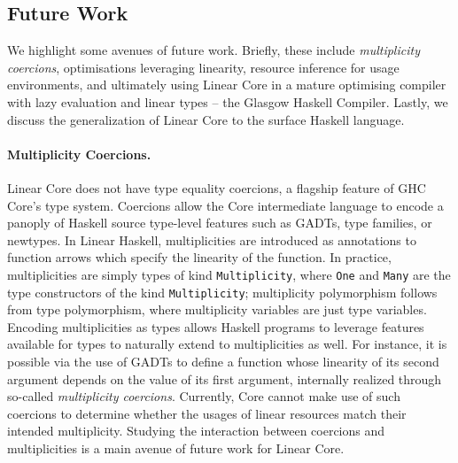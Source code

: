 \documentclass[acmsmall,review,anonymous,screen]{acmart}
\newcommand{\incode}[1]{\lstinline{#1}}
\begin{document}
% 

\subsection{Future Work\label{sec:future-work}}

We highlight some avenues of future work. Briefly,
these include \emph{multiplicity coercions}, optimisations leveraging
linearity, resource inference for usage environments, and ultimately using
Linear Core in a mature optimising compiler with lazy evaluation and linear
types -- the Glasgow Haskell Compiler. Lastly, we discuss the
generalization of Linear Core to the surface Haskell language.

\paragraph{Multiplicity Coercions.}
Linear Core does not have type equality coercions, a flagship feature of GHC
Core's type system.
%
Coercions %
allow the Core intermediate language to encode a panoply of Haskell source
type-level features such as GADTs, type families, or newtypes.
%
In Linear Haskell, multiplicities are introduced as annotations to function
arrows which specify the linearity of the function. In practice,
multiplicities are simply types of kind \incode{Multiplicity}, where \incode{One} and \incode{Many}
are the type constructors of the kind \incode{Multiplicity}; multiplicity polymorphism
follows from type polymorphism, where multiplicity variables are
just type variables. Encoding multiplicities as types allows Haskell programs
to leverage features available for types to naturally extend to multiplicities
as well.
For instance, it is possible via the use of GADTs to define a
function whose linearity of its second argument depends on the value
of its first argument, internally realized through so-called
\emph{multiplicity coercions}. Currently, Core cannot make use of such
coercions to determine whether the usages of linear resources match
their intended multiplicity. Studying the interaction between coercions and multiplicities is a main avenue
of future work for Linear Core.
%
\end{document}

